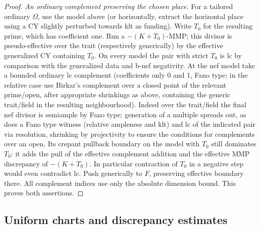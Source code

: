 \begin{proof}
\emph{An ordinary complement preserving the chosen place.}
For a tailored ordinary \(\Omega\), use the model above (or horizontally, extract the horizontal place using a CY slightly perturbed towards klt as funding).
Write \(T_0\) for the resulting prime, which has coefficient one.
Run a \(-(K+T_0)\)-MMP; this divisor is pseudo-effective over the trait (respectively generically) by the effective generalized CY containing \(T_0\).
On every model the pair with strict \(T_0\) is lc by comparison with the generalized data and b-nef negativity.
At the nef model take a bounded ordinary lc complement (coefficients only 0 and 1, Fano type; in the relative case use Birkar's complement over a closed point of the relevant prime/open, after appropriate shrinkings as above, containing the generic trait/field in the resulting neighbourhood).
Indeed over the trait/field the final nef divisor is semiample by Fano type; generation of a multiple spreads out, as does a Fano type witness (relative ampleness and klt) and lc of the indicated pair via resolution, shrinking by projectivity to ensure the conditions for complements over an open.
Its crepant pullback boundary on the model with \(T_0\) still dominates \(T_0\): it adds the pull of the effective complement addition and the effective MMP discrepancy of \(-(K+T_0)\).
In particular contraction of \(T_0\) in a negative step would even contradict lc.
Push generically to \(F\), preserving effective boundary there.
All complement indices use only the absolute dimension bound.
This proves both assertions.

\end{proof}

\subsection{Uniform charts and discrepancy estimates}

